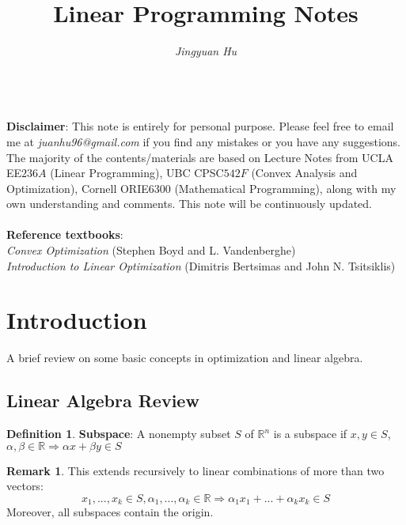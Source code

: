 \documentclass[10pt]{article}
\def\R{\mathbb{R}}
\def\a{\alpha}
\def\b{\beta}
\def\imp{\Rightarrow}
\theoremstyle{definition}
\newtheorem{defn}{Definition}[section]
\newtheorem{remark}{Remark}[section]
\begin{document}
\title{\vspace{-1.6cm} \huge\textbf{{Linear Programming Notes}}}
\author{\large\textit{{Jingyuan Hu}}}
\date{}
\maketitle

\text{}\\
\textbf{Disclaimer}: This note is entirely for personal purpose.
Please feel free to email me at \textit{juanhu96@gmail.com} if you find any mistakes or you have any suggestions.
The majority of the contents/materials are based on Lecture Notes from UCLA EE$236A$ (Linear Programming), 
UBC CPSC$542F$ (Convex Analysis and Optimization), Cornell ORIE$6300$ (Mathematical Programming), 
along with my own understanding and comments. This note will be continuously updated.\\
\\
\textbf{Reference textbooks}:\\
\textit{Convex Optimization} (Stephen Boyd and L. Vandenberghe)\\
\textit{Introduction to Linear Optimization} (Dimitris Bertsimas and John N. Tsitsiklis)\\

\tableofcontents

\section{Introduction}
A brief review on some basic concepts in optimization and linear algebra.

\subsection{Linear Algebra Review}

\begin{defn} \textbf{Subspace}:
	A nonempty subset $S$ of $\R^n$ is a subspace if $x, y \in S$, $\a, \b \in \R \imp \a x + \b y \in S$
\end{defn}

\begin{remark}
	This extends recursively to linear combinations of more than two vectors:
	\begin{equation*}
		x_1, ..., x_k \in S, \a_1, ..., \a_k \in \R \imp \a_1 x_1 + ... + \a_k x_k \in S
	\end{equation*}
	Moreover, all subspaces contain the origin.
\end{remark}
\end{document}
